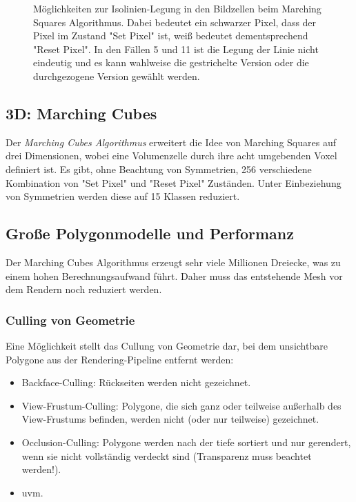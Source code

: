 \documentclass[a4paper, 11pt, accentcolor = tud3b]{tudreport}
\begin{document}
\begin{figure}
					\caption{Möglichkeiten zur Isolinien-Legung in den Bildzellen beim Marching Squares Algorithmus. Dabei bedeutet ein schwarzer Pixel, dass der Pixel im Zustand "Set Pixel" ist, weiß bedeutet dementsprechend "Reset Pixel". In den Fällen \num{5} und \num{11} ist die Legung der Linie nicht eindeutig und es kann wahlweise die gestrichelte Version oder die durchgezogene Version gewählt werden.}
					\label{fig:marching_squares}
				\end{figure}

			\subsection{3D: Marching Cubes}
				Der \emph{Marching Cubes Algorithmus} erweitert die Idee von Marching Squares auf drei Dimensionen, wobei eine Volumenzelle durch ihre acht umgebenden Voxel definiert ist. Es gibt, ohne Beachtung von Symmetrien, \num{256} verschiedene Kombination von "Set Pixel" und "Reset Pixel" Zuständen. Unter Einbeziehung von Symmetrien werden diese auf \num{15} Klassen reduziert.

			\subsection{Große Polygonmodelle und Performanz}
				Der Marching Cubes Algorithmus erzeugt sehr viele Millionen Dreiecke, was zu einem hohen Berechnungsaufwand führt. Daher muss das entstehende Mesh vor dem Rendern noch reduziert werden.

				\subsubsection{Culling von Geometrie}
					Eine Möglichkeit stellt das Cullung von Geometrie dar, bei dem unsichtbare Polygone aus der Rendering-Pipeline entfernt werden:
					\begin{itemize}
						\item Backface-Culling: Rückseiten werden nicht gezeichnet.
						\item View-Frustum-Culling: Polygone, die sich ganz oder teilweise außerhalb des View-Frustums befinden, werden nicht (oder nur teilweise) gezeichnet.
						\item Occlusion-Culling: Polygone werden nach der tiefe sortiert und nur gerendert, wenn sie nicht vollständig verdeckt sind (Transparenz muss beachtet werden!).
						\item uvm.
					\end{itemize}
\end{document}
